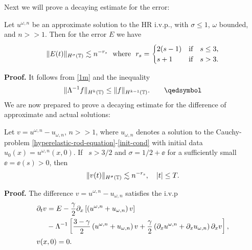 %
%
%
Next we will prove a decaying estimate for the error:
%
%
%
%
%                      
%
%
%
%
\begin{lemma}
\label{lem:error_of_approx_solution}
Let $u^{\omega,n}$ be an approximate solution to the HR i.v.p., with 
$\sigma \le 1$,  $\omega$ bounded, and $n >> 1$.
Then for the error $E$ we have
%
%
\begin{equation}
\label{total-error-approx-solution}
\begin{split}
	\|E(t)\|_{H^\sigma(\mathbb{T})} \lesssim n^{-r_s} \ \ \text{where} \ \ r_s = 
\begin{cases}
2(s-1)   & \text{if} \quad s \le 3,\\  s+1  & \text{if} \quad s > 3. \\
\end{cases}
\end{split}
\end{equation}
%
%
%
%
\end{lemma}
%
%
%
%
%
%
%
\textbf{Proof.} It follows from \eqref{1m} and the inequality
%
%
%
%
\begin{equation*}
\begin{split}
\|\Lambda^{-1}f \|_{H^{k}(\ci)} \le
\|f\|_{H^{k-1}(\ci)}. \qquad \qedsymbol
\label{operator norm of pseudo-diff operator we use}
\end{split}
\end{equation*}
%
%
%
%
%
%
%
%
%
%
We are now prepared to prove a decaying estimate for the difference of 
approximate and actual solutions:
%
%
\begin{proposition}
\label{prop:bound_for_difference-of-approx-actual-soln}
Let $v=u^{\omega,n} - u_{\omega,n}$, $n >>1$,
where $u_{\omega,n}$ denotes a solution to
the Cauchy-problem \eqref{hyperelastic-rod-equation}-\eqref{init-cond} with
initial data $u_0(x) = u^{\omega,n}(x,0)$.
If \ $s > 3/2 $ and $\sigma = 1/2 + \ee$ for a sufficiently
small $\ee = \ee(s) > 0$, then 
%
%
\begin{equation} \label{differ-Hsigma-est} \|
v(t)
\|_{H^\sigma(\mathbb{T})}
\lesssim n^{-r_s}, \quad |t| \le T.
\end{equation}
%
%
\end{proposition}
%
%
\textbf{{Proof.}} The difference $v = u^{\omega,n} - u_{\omega,n}$ satisfies 
the i.v.p
\begin{align}
\label{1.7}
& \p_t v  =  E - \frac{\gamma}{2} \p_x
\left[ \left( u^{\omega,n} + u_{\omega,n} \right)v \right]
\\
\notag & \phantom{\p_t v} - \Lambda^{-1} \left[
\frac{3-\gamma}{2} \left( u^{\omega,n} + u_{\omega,n}
\right) v +
\frac{\gamma}{2}\left( \p_x u^{\omega,n} +
\p_x u_{\omega,n}
\right) \p_x v
\right], \\
& v(x,0)=0.
\end{align}
